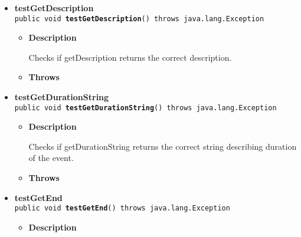 \documentclass[11pt,a4paper]{report}
\begin{document}
{{{\begin{itemize}
{\begin{itemize}
{Checks if getColor returns the correct color for a CalEvent.
}
\item{{\bf  Throws}
}%
\end{itemize}
}%
\item{ 
\hypertarget{is.mpg.ruglan.test.CalEventTest.testGetDescription()}{{\bf  testGetDescription}\\}
\texttt{public void\ {\bf  testGetDescription}() throws java.lang.Exception
\label{is.mpg.ruglan.test.CalEventTest.testGetDescription()}}%
\begin{itemize}
\item{
{\bf  Description}

Checks if getDescription returns the correct description.
}
\item{{\bf  Throws}
}%
\end{itemize}
}%
\item{ 
\hypertarget{is.mpg.ruglan.test.CalEventTest.testGetDurationString()}{{\bf  testGetDurationString}\\}
\texttt{public void\ {\bf  testGetDurationString}() throws java.lang.Exception
\label{is.mpg.ruglan.test.CalEventTest.testGetDurationString()}}%
\begin{itemize}
\item{
{\bf  Description}

Checks if getDurationString returns the correct string describing duration of the event.
}
\item{{\bf  Throws}
}%
\end{itemize}
}%
\item{ 
\hypertarget{is.mpg.ruglan.test.CalEventTest.testGetEnd()}{{\bf  testGetEnd}\\}
\texttt{public void\ {\bf  testGetEnd}() throws java.lang.Exception
\label{is.mpg.ruglan.test.CalEventTest.testGetEnd()}}%
\begin{itemize}
\item{
{\bf  Description}

}
\end{itemize}}
\end{itemize}}}}
\end{document}

